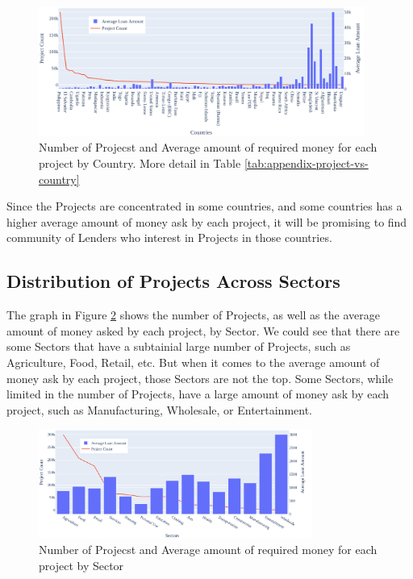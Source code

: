 \begin{figure}[H]
	\centering
	\includegraphics[width=0.95\textwidth]{images/project-vs-country.pdf}
	\caption[Number of Projecst and Average amount of required money for each project by Country]{
		Number of Projecst and Average amount of required money for each project by Country.
		More detail in Table \ref{tab:appendix-project-vs-country}
	}
	\label{fig:country-project-distribution}
\end{figure}


Since the Projects are concentrated in some countries,
and some countries has a higher average amount of money ask by each project,
it will be promising to find community of Lenders who interest in Projects in those countries.


\subsection{Distribution of Projects Across Sectors}

The graph in Figure \ref{fig:project-vs-sector} shows the number of Projects,
as well as the average amount of money asked by each project, by Sector.
We could see that there are some Sectors that have a subtainial large number of Projects, such as Agriculture, Food, Retail, etc.
But when it comes to the average amount of money ask by each project, those Sectors are not the top.
Some Sectors, while limited in the number of Projects, have a large amount of money ask by each project, such as Manufacturing, Wholesale, or Entertainment.

\begin{figure}[H]
	\centering
	\includegraphics[width=0.8\textwidth]{images/project-vs-sector.pdf}
	\caption[Number of Projecst and Average amount of required money for each project by Sector]{
		Number of Projecst and Average amount of required money for each project by Sector
	}
	\label{fig:project-vs-sector}
\end{figure}

